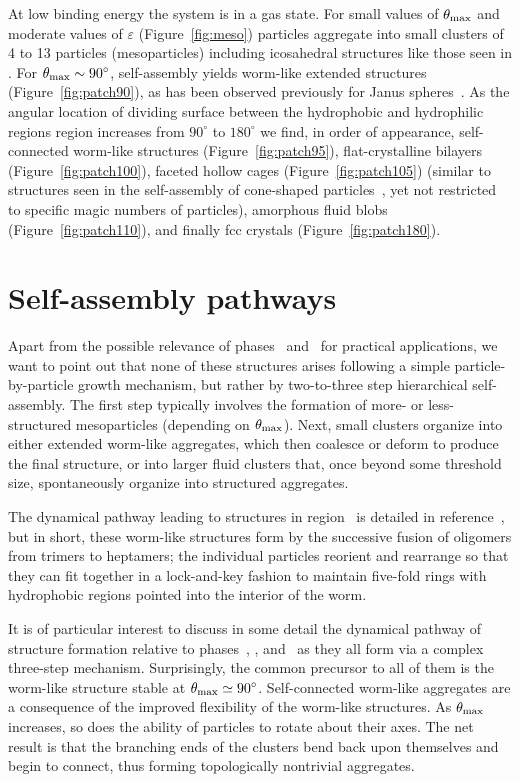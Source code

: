 At low binding energy the system is in a gas state.
For small values of $\theta_{\rm max}$ and moderate values of $\varepsilon$ (Figure~\ref{fig:meso}) particles aggregate into small  clusters of 4 to 13 particles (mesoparticles)  {including icosahedral structures like those seen in \cite{wilber}}.
For $\theta_{\rm max} \sim 90^{\circ}$, self-assembly yields worm-like extended structures (Figure~\ref{fig:patch90}), as has been observed previously for Janus spheres~\cite{Hong2}. 
As the angular location of dividing surface between the hydrophobic and hydrophilic regions region increases from $90^{\circ}$ to $180^{\circ}$  we find, in order of appearance,  self-connected worm-like structures (Figure~\ref{fig:patch95}), flat-crystalline bilayers  (Figure~\ref{fig:patch100}), faceted hollow cages (Figure~\ref{fig:patch105}) (similar to structures seen in the self-assembly of cone-shaped particles~\cite{glotzer6,glotzer3}, yet not restricted to specific magic numbers of particles), amorphous fluid  blobs (Figure~\ref{fig:patch110}), and finally fcc crystals (Figure~\ref{fig:patch180}).

\section{Self-assembly pathways}\label{sec:Ostwald}

Apart from the possible relevance of phases~ and~ for practical applications, we want to point out that none of these structures arises following a  simple particle-by-particle growth mechanism, but rather by  two-to-three step hierarchical self-assembly.
The first step typically involves the formation of   {more- or less-structured} mesoparticles (depending on $\theta_{\rm max}$). 
Next, small clusters organize into either  extended worm-like aggregates, which  then coalesce or deform to produce the final structure,  or into larger fluid clusters that, once beyond some threshold size, spontaneously organize into structured aggregates.

The dynamical pathway leading to structures in region~ is detailed in reference~\cite{Hong2}, but in short, these worm-like structures form by the successive fusion of oligomers from trimers to heptamers; the individual particles reorient and rearrange so that they can fit together in a lock-and-key fashion to maintain five-fold rings with hydrophobic regions pointed into the interior of the worm.

It is of particular interest to discuss in some detail the dynamical pathway of structure formation relative to phases~, , and~  as they all form via a complex three-step mechanism.
Surprisingly, the common precursor  to all of them is the worm-like structure stable at $\theta_{\rm max}\simeq 90^{\circ}$.
Self-connected worm-like aggregates  are a consequence of the improved flexibility of the  worm-like structures. As $\theta_{\rm max}$ increases, so does the ability of particles to rotate about their axes. 
The net result is that the branching ends of the clusters bend back upon themselves and begin to connect, thus forming topologically nontrivial aggregates.

